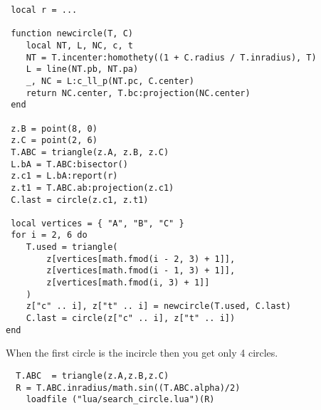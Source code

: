 \begin{mybox}
\begin{verbatim}
 local r = ...

 function newcircle(T, C)
 	local NT, L, NC, c, t
 	NT = T.incenter:homothety((1 + C.radius / T.inradius), T)
 	L = line(NT.pb, NT.pa)
 	_, NC = L:c_ll_p(NT.pc, C.center)
 	return NC.center, T.bc:projection(NC.center)
 end

 z.B = point(8, 0)
 z.C = point(2, 6)
 T.ABC = triangle(z.A, z.B, z.C)
 L.bA = T.ABC:bisector()
 z.c1 = L.bA:report(r)
 z.t1 = T.ABC.ab:projection(z.c1)
 C.last = circle(z.c1, z.t1)

 local vertices = { "A", "B", "C" }
 for i = 2, 6 do
	T.used = triangle(
		z[vertices[math.fmod(i - 2, 3) + 1]],
		z[vertices[math.fmod(i - 1, 3) + 1]],
		z[vertices[math.fmod(i, 3) + 1]]
	)
	z["c" .. i], z["t" .. i] = newcircle(T.used, C.last)
	C.last = circle(z["c" .. i], z["t" .. i])
end
\end{verbatim}
\end{mybox}


\vspace{1em}



\begin{tkzexample}[vbox]
\end{tkzexample}

\vspace{12pt}
When the first circle is the incircle then you get only 4 circles.

\begin{mybox}
  \begin{verbatim}
  T.ABC  = triangle(z.A,z.B,z.C)
  R = T.ABC.inradius/math.sin((T.ABC.alpha)/2)
    loadfile ("lua/search_circle.lua")(R)
  \end{verbatim}
\end{mybox}

\begin{tkzexample}[vbox]

\end{tkzexample}
\endinput